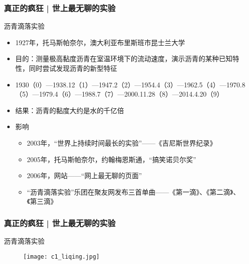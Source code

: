 \begin{frame}
  \frametitle{真正的疯狂 | 世上最无聊的实验}
  \begin{block}{沥青滴落实验}
    \begin{itemize}
      \item 1927年，托马斯\textbullet 帕奈尔，澳大利亚布里斯班市昆士兰大学
      \item 目的：测量极高黏度沥青在室温环境下的流动速度，演示沥青的某种已知特性，同时尝试发现沥青的新型特征
      \pause
      \item 1930（0）—1938.12（1）—1947.2（2）—1954.4（3）—1962.5（4）—1970.8（5）—1979.4（6）—1988.7（7）—2000.11.28（8）—2014.4.20（9）
      \item 结果：沥青的黏度大约是水的千亿倍
      \item 影响
        \begin{itemize}
          \item 2003年，“世界上持续时间最长的实验”——《吉尼斯世界纪录》
          \item 2005年，托马斯\textbullet 帕奈尔，约翰\textbullet 梅恩斯通，“搞笑诺贝尔奖”
          \item 2006年，网站——“网上最无聊的页面”
          \item “沥青滴落实验”乐团在聚友网发布三首单曲——《第一滴》、《第二滴》、《第三滴》
        \end{itemize}
    \end{itemize}
  \end{block}
\end{frame}

\begin{frame}
  \frametitle{真正的疯狂 | 世上最无聊的实验}
  \begin{block}{沥青滴落实验}
    \begin{figure}
      \centering
      \texttt{[image: c1\_liqing.jpg]}
    \end{figure}
  \end{block}
\end{frame}

